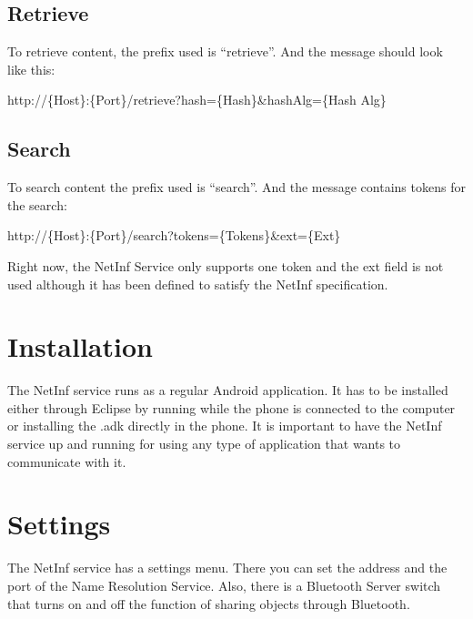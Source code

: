 \documentclass[10pt,a4paper]{article}
\begin{document}
\subsection{Retrieve}
To retrieve content, the prefix used is ``retrieve''. And the message should look like this:\\

\begin{center}
http://\{Host\}:\{Port\}/retrieve?hash=\{Hash\}\&hashAlg=\{Hash Alg\}\\\end{center}


\subsection{Search}
To search content the prefix used is ``search''. And the message contains tokens for the search:\\

\begin{center}
http://\{Host\}:\{Port\}/search?tokens=\{Tokens\}\&ext=\{Ext\}\\
\end{center}
Right now, the NetInf Service only supports one token and the ext field is not used although it has been defined to satisfy the NetInf specification.\\


\section{Installation}
The NetInf service runs as a regular Android application. It has to be installed either through Eclipse by running while the phone is connected to the computer 
or installing the .adk directly in the phone. It is important to have the NetInf service up and running for using any type of application that wants to communicate with it. \\


\section{Settings}
The NetInf service has a settings menu. There you can set the address and the port of the Name Resolution Service. Also, there is a Bluetooth Server switch that turns on 
and off the function of sharing objects through Bluetooth.\\
\end{document}

